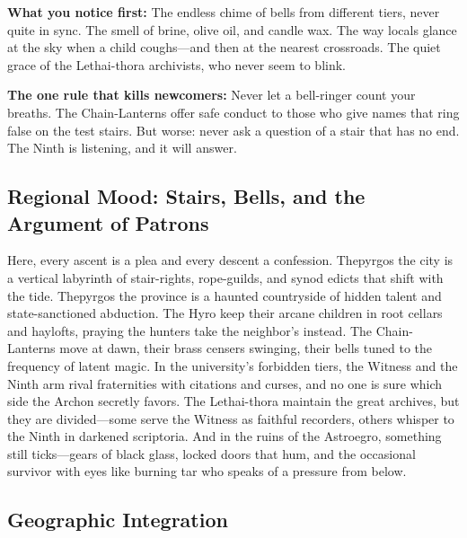 \begin{tcolorbox}[colback=black!3,colframe=blue!60!black,title={Theme \& Atmosphere},breakable]
\vspace{2mm}
\textbf{What you notice first:} The endless chime of bells from different tiers, never quite in sync. The smell of brine, olive oil, and candle wax. The way locals glance at the sky when a child coughs---and then at the nearest crossroads. The quiet grace of the Lethai-thora archivists, who never seem to blink.

\textbf{The one rule that kills newcomers:} Never let a bell-ringer count your breaths. The Chain-Lanterns offer safe conduct to those who give names that ring false on the test stairs. But worse: never ask a question of a stair that has no end. The Ninth is listening, and it will answer.
\end{tcolorbox}

\subsection*{Regional Mood: Stairs, Bells, and the Argument of Patrons}

Here, every ascent is a plea and every descent a confession. Thepyrgos the city is a vertical labyrinth of stair-rights, rope-guilds, and synod edicts that shift with the tide. Thepyrgos the province is a haunted countryside of hidden talent and state-sanctioned abduction. The Hyro keep their arcane children in root cellars and haylofts, praying the hunters take the neighbor's instead. The Chain-Lanterns move at dawn, their brass censers swinging, their bells tuned to the frequency of latent magic. In the university's forbidden tiers, the Witness and the Ninth arm rival fraternities with citations and curses, and no one is sure which side the Archon secretly favors. The Lethai-thora maintain the great archives, but they are divided---some serve the Witness as faithful recorders, others whisper to the Ninth in darkened scriptoria. And in the ruins of the Astroegro, something still ticks---gears of black glass, locked doors that hum, and the occasional survivor with eyes like burning tar who speaks of a pressure from below.

\subsection*{Geographic Integration}

